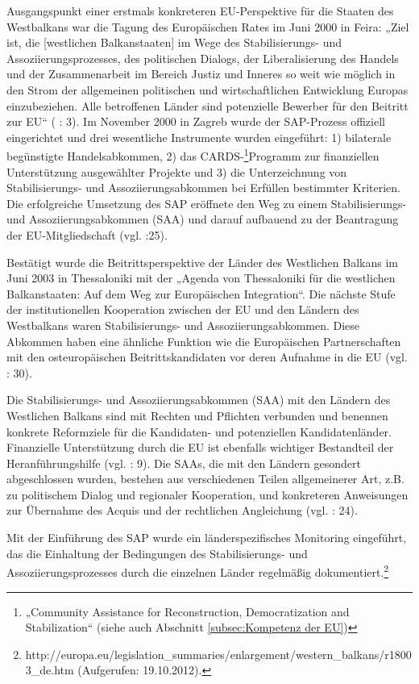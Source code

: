 Ausgangspunkt einer erstmals konkreteren EU-Perspektive für die Staaten des Westbalkans war die Tagung des Europäischen Rates im Juni 2000 in Feira: „Ziel ist, die [westlichen Balkanstaaten] im Wege des Stabilisierungs- und Assoziierungsprozesses, des politischen Dialogs, der Liberalisierung des Handels und der Zusammenarbeit im Bereich Justiz und Inneres so weit wie möglich in den Strom der allgemeinen politischen und wirtschaftlichen Entwicklung Europas einzubeziehen. Alle betroffenen Länder sind potenzielle Bewerber für den Beitritt zur EU“ (\cite{euko05} : 3). Im November 2000 in Zagreb wurde der SAP-Prozess offiziell eingerichtet und drei wesentliche Instrumente wurden eingeführt: 1) bilaterale begünstigte Handelsabkommen, 2) das CARDS-\footnote{„Community Assistance for Reconstruction, Democratization and Stabilization“ (siehe auch Abschnitt \ref{subsec:Kompetenz der EU})}Programm zur finanziellen Unterstützung ausgewählter Projekte und 3) die Unterzeichnung von Stabilisierungs- und Assoziierungsabkommen bei Erfüllen bestimmter Kriterien. Die erfolgreiche Umsetzung des SAP eröffnete den Weg zu einem Stabilisierungs- und Assoziierungsabkommen (SAA) und darauf aufbauend zu der Beantragung der EU-Mitgliedschaft (vgl. \cite{inotai} :25). \par
Bestätigt wurde die Beitrittsperspektive der Länder des Westlichen Balkans im Juni 2003 in Thessaloniki mit der „Agenda von Thessaloniki für die westlichen Balkanstaaten: Auf dem Weg zur Europäischen Integration“. Die nächste Stufe der institutionellen Kooperation zwischen der EU und den Ländern des Westbalkans waren Stabilisierungs- und Assoziierungsabkommen. Diese Abkommen haben eine ähnliche Funktion wie die Europäischen Partnerschaften mit den osteuropäischen Beitrittskandidaten vor deren Aufnahme in die EU (vgl. \cite{inotai} : 30).\par
Die Stabilisierungs- und Assoziierungsabkommen (SAA) mit den Ländern des Westlichen Balkans sind mit Rechten und Pflichten verbunden und benennen konkrete Reformziele für die Kandidaten- und potenziellen Kandidatenländer. Finanzielle Unterstützung durch die EU ist ebenfalls wichtiger Bestandteil der Heranführungshilfe (vgl. \cite{euko07} : 9). Die SAAs, die mit den Ländern gesondert abgeschlossen wurden, bestehen aus verschiedenen Teilen allgemeinerer Art, z.B. zu politischem Dialog und regionaler Kooperation, und konkreteren Anweisungen zur Übernahme des Acquis und der rechtlichen Angleichung (vgl. \cite{marwedel} : 24).\par
Mit der Einführung des SAP wurde ein länderspezifisches Monitoring eingeführt, das die Einhaltung der Bedingungen des Stabilisierungs- und Assoziierungsprozesses durch die einzelnen Länder regelmäßig dokumentiert.\footnote{http://europa.eu/legislation\_summaries/enlargement/western\_balkans/r18003\_de.htm (Aufgerufen: 19.10.2012).}\par
